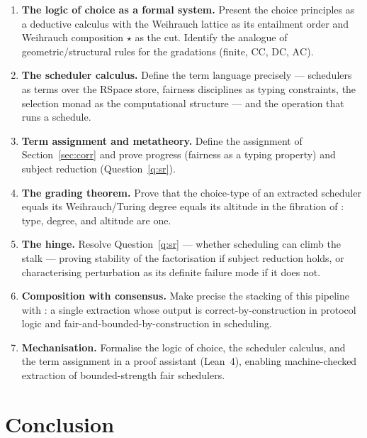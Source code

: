 \documentclass[11pt]{article}
\theoremstyle{definition}
\theoremstyle{plain}
\theoremstyle{remark}
\newcommand{\AC}{\mathrm{AC}}
\newcommand{\DC}{\mathrm{DC}}
\newcommand{\CC}{\mathrm{CC}}
\begin{document}
\begin{enumerate}[label=P\arabic*.,leftmargin=2.4em]
\item \textbf{The logic of choice as a formal system.} Present the choice principles as a deductive calculus with
the Weihrauch lattice \cite{weihrauch} as its entailment order and Weihrauch composition $\star$ as the cut. Identify
the analogue of geometric/structural rules for the gradations (finite, $\CC$, $\DC$, $\AC$).
\item \textbf{The scheduler calculus.} Define the term language precisely --- schedulers as terms over the RSpace
store, fairness disciplines as typing constraints, the selection monad \cite{escardo} as the computational structure
--- and the operation that runs a schedule.
\item \textbf{Term assignment and metatheory.} Define the assignment of Section~\ref{sec:corr} and prove progress
(fairness as a typing property) and subject reduction (Question~\ref{q:sr}).
\item \textbf{The grading theorem.} Prove that the choice-type of an extracted scheduler equals its
Weihrauch/Turing degree equals its altitude in the fibration of \cite{agency}: type, degree, and altitude are one.
\item \textbf{The hinge.} Resolve Question~\ref{q:sr} --- whether scheduling can climb the stalk --- proving stability
of the factorisation if subject reduction holds, or characterising perturbation as its definite failure mode if it does
not.
\item \textbf{Composition with consensus.} Make precise the stacking of this pipeline with \cite{consensus}: a single
extraction whose output is correct-by-construction in protocol logic and fair-and-bounded-by-construction in scheduling.
\item \textbf{Mechanisation.} Formalise the logic of choice, the scheduler calculus, and the term assignment in a proof
assistant (Lean~4), enabling machine-checked extraction of bounded-strength fair schedulers.
\end{enumerate}

\section{Conclusion}
\end{document}

